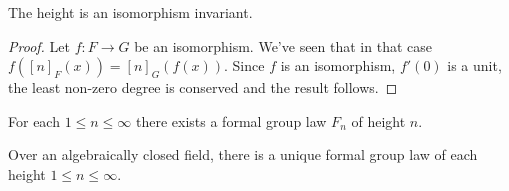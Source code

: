 \begin{lemma*}
	The height is an isomorphism invariant.
\end{lemma*}

\begin{proof}
	Let $f: F \to G$ be an isomorphism.
	We've seen that in that case
	$
		f\left(\left[n\right]_F \left(x\right)\right)
		=
		\left[n\right]_G \left(f\left(x\right)\right)
	$.
	Since $f$ is an isomorphism, $f'\left(0\right)$ is a unit, the least non-zero degree is conserved and the result follows.
\end{proof}

\begin{theorem*}
	For each $1 \leq n \leq \infty$ there exists a formal group law $F_n$ of height $n$.
\end{theorem*}

\begin{theorem*}
	Over an algebraically closed field, there is a unique formal group law of each height $1 \leq n \leq \infty$.
\end{theorem*}
